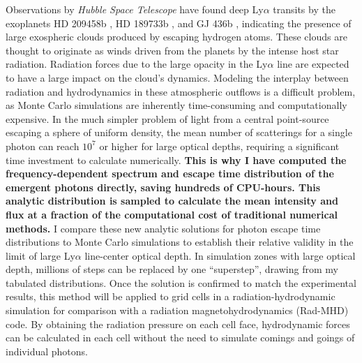 \documentclass[onecolumn]{aastex63}
\begin{document}
Observations by \textit{Hubble Space Telescope} have found deep Ly$\alpha$ transits by the exoplanets HD 209458b \citep{vidal-madjar2003}, HD 189733b \citep{2012A&A...543L...4L}, and  GJ 436b \citep{ehrenreich2015}, indicating the presence of large exospheric clouds produced by escaping hydrogen atoms. These clouds are thought to originate as winds driven from the planets by the intense host star radiation. Radiation forces due to the large opacity in the Ly$\alpha$ line are expected to have a large impact on the cloud's dynamics. Modeling the interplay between radiation and hydrodynamics in these atmospheric outflows is a difficult problem, as Monte Carlo simulations are inherently time-consuming and computationally expensive. In the much simpler problem of light from a central point-source escaping a sphere of uniform density, the mean number of scatterings for a single photon can reach $10^{7}$ or higher for large optical depths, requiring a significant time investment to calculate numerically. \textbf{This is why I have computed the frequency-dependent spectrum and escape time distribution of the emergent photons directly, saving hundreds of CPU-hours. This analytic distribution is sampled to calculate the mean intensity and flux at a fraction of the computational cost of traditional numerical methods.} I compare these new analytic solutions for photon escape time distributions to Monte Carlo simulations to establish their relative validity in the limit of large Ly$\alpha$ line-center optical depth. In simulation zones with large optical depth, millions of steps can be replaced by one ``superstep'', drawing from my tabulated distributions. Once the solution is confirmed to match the experimental results, this method will be applied to grid cells in a radiation-hydrodynamic simulation for comparison with a radiation magnetohydrodynamics (Rad-MHD) code. By obtaining the radiation pressure on each cell face, hydrodynamic forces can be calculated in each cell without the need to simulate comings and goings of individual photons.
\end{document}
